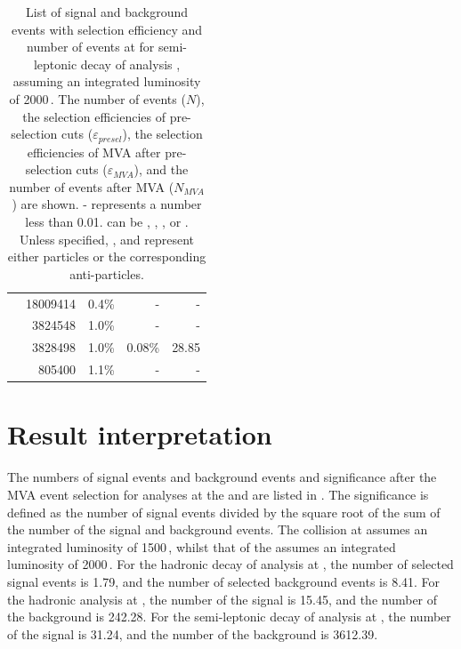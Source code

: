 \begin{table}[!htbp]
\begin{tabular}{lrrrr}
\hline
\gammagamma{\Pphoton}{\BS}{\Pphoton}{\BS}{ \Pquark \Pquark \Pquark \Pquark}& 18009414  & 0.4\%&   - & - \\
\gammagamma{\Pphoton}{\BS}{\Pphoton}{\EPA}{ \Pquark \Pquark \Pquark \Pquark}& 3824548 & 1.0\%&  - & - \\
\gammagamma{\Pphoton}{\EPA}{\Pphoton}{\BS}{ \Pquark \Pquark \Pquark \Pquark}& 3828498 & 1.0\%&  0.08\% & 28.85 \\
\gammagamma{\Pphoton}{\EPA}{\Pphoton}{\EPA}{ \Pquark \Pquark \Pquark \Pquark}& 805400& 1.1\%&  - & - \\
\hline \hline
\end{tabular}
\caption
{List of signal and background events with selection efficiency and number of events at   for semi-leptonic \WW decay of \eeToHHbbWW analysis , assuming an integrated luminosity of 2000\,. The number of events ($N$), the selection efficiencies of pre-selection cuts ($\varepsilon_{presel}$), the selection efficiencies of MVA after pre-selection cuts ($\varepsilon_{MVA}$), and the number of events after MVA ($N_{MVA}$) are shown. - represents a number less than 0.01. \Pquark can be \Pup, \Pdown, \Pstrange, \Pbottom or \Ptop. Unless specified, \Pquark, \Plepton and \Pnu represent either particles or the corresponding anti-particles.}
\label{tab:doubleHiggsQlv3TeVMVA}
\end{table}
\section{Result interpretation}
\label{sec:doubleHiggsResults}



The numbers of signal events and background events and significance after the MVA event selection for analyses at the  and   are listed in . The significance is defined as the number of signal events divided by the square root of the sum of the number of the signal and background events. The \ee collision at  assumes an integrated luminosity of 1500\,, whilst that of the  assumes an integrated luminosity of 2000\,.  For the hadronic \WW decay of \eeToHHbbWW analysis at , the number of selected signal events is 1.79, and the number of selected background events is 8.41. For the hadronic analysis at , the number of the signal is 15.45, and the number of the background is 242.28. For the semi-leptonic \WW decay of \eeToHHbbWW analysis at , the number of the signal is 31.24, and the number of the background is 3612.39.

